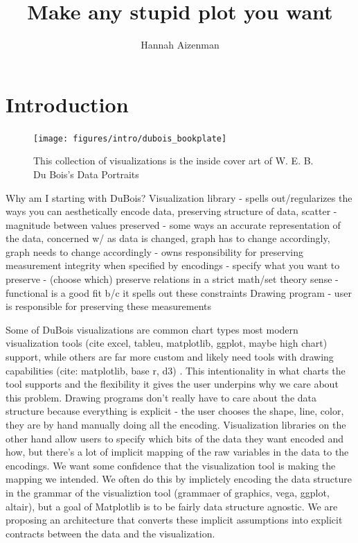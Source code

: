 \documentclass[letterpaper,onecolumn,titlepage]{Ythesis}
\title{Make any stupid plot you want}
\author{Hannah Aizenman}
\begin{document}
\makefrontmatter

\section{Introduction}
\label{sec:introduction}
\begin{figure}
    \texttt{[image: figures/intro/dubois\_bookplate]}
    \caption{This collection of visualizations is the inside cover art of W. E. B. Du Bois's Data Portraits\cite{duboiscenterattheuniversityofmassachusettsBoisDataPortraits2018}}
    \label{fig:dubois_bookplate}
\end{figure}

Why am I starting with DuBois? 
Visualization library - spells out/regularizes the ways you can aesthetically encode data, preserving structure of data, scatter - magnitude between values preserved - some ways an accurate representation of the data, concerned w/ as data is changed, graph has to change accordingly, graph needs to change accordingly - owns responsibility for preserving measurement integrity when specified by encodings
    - specify what you want to preserve
        - (choose which) preserve relations in a strict math/set theory sense
    - functional is a good fit b/c it spells out these constraints 
Drawing program - user is responsible for preserving these measurements 

 Some of DuBois visualizations are common chart types most modern visualization tools (cite excel, tableu, matplotlib, ggplot, maybe high chart) support, while others are far more custom and likely need tools with drawing capabilities (cite: matplotlib, base r, d3) \cite{duboiscenterattheuniversityofmassachusettsBoisDataPortraits2018}. This intentionality in what charts the tool supports and the flexibility it gives the user underpins why we care about this problem. Drawing programs don't really have to care about the data structure because everything is explicit - the user chooses the shape, line, color, they are by hand manually doing all the encoding. Visualization libraries on the other hand allow users to specify which bits of the data they want encoded and how, but there's a lot of implicit mapping of the raw variables in the data to the encodings. We want some confidence that the visualization tool is making the mapping we intended. We often do this by implictely encoding the data structure in the grammar of the visualiztion tool (grammaer of graphics, vega, ggplot, altair), but a goal of Matplotlib \cite{huntermatplotlib2007} is to be fairly data structure agnostic. We are proposing an architecture that converts these implicit assumptions into explicit contracts between the data and the visualization. 
\end{document}
